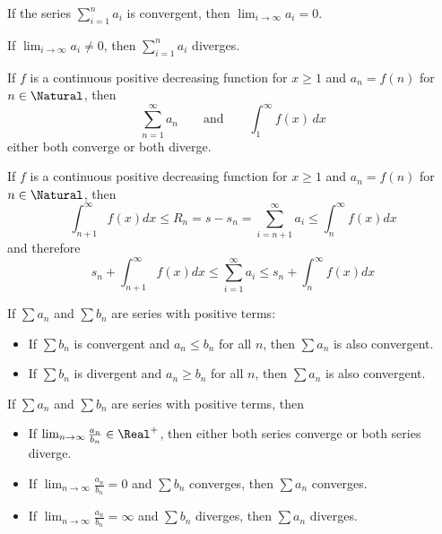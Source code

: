 \begin{theorem} If the series $\sum_{i = 1}^n a_i$ is convergent, then $\lim_{i \to \infty} a_i = 0$.
\end{theorem}

\begin{theorem} If $\lim_{i \to \infty} a_i \neq 0$, then $\sum_{i = 1}^n a_i$ diverges.
\end{theorem}

\begin{theorem} If $f$ is a continuous positive decreasing function for $x \geq 1$ and $a_n = f(n)$ for $n \in \Natural$, then
  \[
    \sum_{n = 1}^\infty a_n \qquad \text{and} \qquad \int_1^\infty f(x) \,dx
  \]
    either both converge or both diverge.
\end{theorem}

\begin{theorem}If $f$ is a continuous positive decreasing function for $x \geq 1$ and $a_n = f(n)$ for $n \in \Natural$, then
  \[
    \int_{n+1}^\infty f(x) dx \leq R_n = s - s_n = \sum_{i = n+1}^\infty a_i \leq \int_{n}^\infty f(x) dx
  \]
  and therefore
  \[
    s_n + \int_{n+1}^\infty f(x) dx \leq \sum_{i = 1}^\infty a_i \leq s_n + \int_{n}^\infty f(x) dx
  \]
\end{theorem}

\begin{theorem} If $\sum a_n$ and $\sum b_n$ are series with positive terms:
  \begin{itemize}
    \item If $\sum b_n$ is convergent and $a_n \leq b_n$ for all $n$, then $\sum a_n$ is also convergent.
    \item If $\sum b_n$ is divergent and $a_n \geq b_n$ for all $n$, then $\sum a_n$ is also convergent.
  \end{itemize}
\end{theorem}

\begin{theorem} If $\sum a_n$ and $\sum b_n$ are series with positive terms, then
  \begin{itemize}
    \item If $\lim_{n \to \infty} \frac{a_n}{b_n} \in \Real^+$, then either both series converge or both series diverge.
    \item If $\lim_{n \to \infty} \frac{a_n}{b_n} = 0$ and $\sum b_n$ converges, then $\sum a_n$ converges.
    \item If $\lim_{n \to \infty} \frac{a_n}{b_n} = \infty$ and $\sum b_n$ diverges, then $\sum a_n$ diverges.
  \end{itemize}
\end{theorem}

